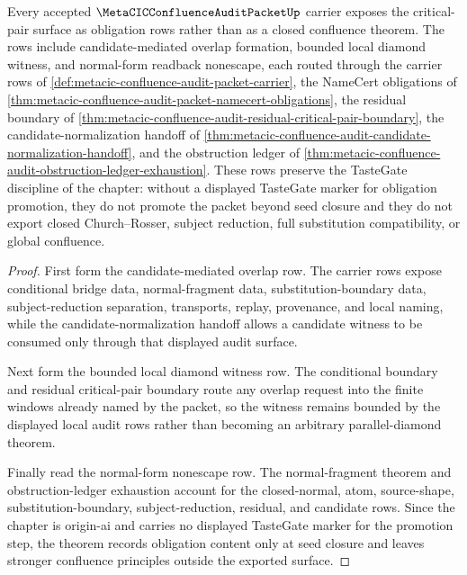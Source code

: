 \begin{theorem}
\label{thm:metacic-confluence-critical-pair-obligations}
Every accepted $\MetaCICConfluenceAuditPacketUp$ carrier exposes the critical-pair surface as obligation rows rather than as a closed confluence theorem. The rows include candidate-mediated overlap formation, bounded local diamond witness, and normal-form readback nonescape, each routed through the carrier rows of \autoref{def:metacic-confluence-audit-packet-carrier}, the NameCert obligations of \autoref{thm:metacic-confluence-audit-packet-namecert-obligations}, the residual boundary of \autoref{thm:metacic-confluence-audit-residual-critical-pair-boundary}, the candidate-normalization handoff of \autoref{thm:metacic-confluence-audit-candidate-normalization-handoff}, and the obstruction ledger of \autoref{thm:metacic-confluence-audit-obstruction-ledger-exhaustion}. These rows preserve the TasteGate discipline of the chapter: without a displayed TasteGate marker for obligation promotion, they do not promote the packet beyond seed closure and they do not export closed Church--Rosser, subject reduction, full substitution compatibility, or global confluence.
\end{theorem}
\begin{proof}
First form the candidate-mediated overlap row. The carrier rows expose conditional bridge data, normal-fragment data, substitution-boundary data, subject-reduction separation, transports, replay, provenance, and local naming, while the candidate-normalization handoff allows a candidate witness to be consumed only through that displayed audit surface.

Next form the bounded local diamond witness row. The conditional boundary and residual critical-pair boundary route any overlap request into the finite windows already named by the packet, so the witness remains bounded by the displayed local audit rows rather than becoming an arbitrary parallel-diamond theorem.

Finally read the normal-form nonescape row. The normal-fragment theorem and obstruction-ledger exhaustion account for the closed-normal, atom, source-shape, substitution-boundary, subject-reduction, residual, and candidate rows. Since the chapter is origin-ai and carries no displayed TasteGate marker for the promotion step, the theorem records obligation content only at seed closure and leaves stronger confluence principles outside the exported surface.
\end{proof}

